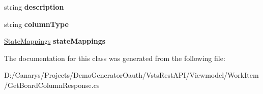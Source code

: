 \begin{DoxyCompactItemize}
\item 
\mbox{\label{class_vsts_rest_a_p_i_1_1_viewmodel_1_1_work_item_1_1_get_board_column_response_1_1_value_a8d75062eb2d2dd4a5b7fe8fcb79acae1}} 
string {\bfseries description}
\item 
\mbox{\label{class_vsts_rest_a_p_i_1_1_viewmodel_1_1_work_item_1_1_get_board_column_response_1_1_value_a50181a91ed336cd9a1e118842fd2546d}} 
string {\bfseries column\+Type}
\item 
\mbox{\label{class_vsts_rest_a_p_i_1_1_viewmodel_1_1_work_item_1_1_get_board_column_response_1_1_value_a2381bc2a31031d7121a291a00adde602}} 
\mbox{\hyperlink{class_vsts_rest_a_p_i_1_1_viewmodel_1_1_work_item_1_1_get_board_column_response_1_1_state_mappings}{State\+Mappings}} {\bfseries state\+Mappings}
\end{DoxyCompactItemize}


The documentation for this class was generated from the following file\+:\begin{DoxyCompactItemize}
\item 
D\+:/\+Canarys/\+Projects/\+Demo\+Generator\+Oauth/\+Vsts\+Rest\+A\+P\+I/\+Viewmodel/\+Work\+Item/Get\+Board\+Column\+Response.\+cs\end{DoxyCompactItemize}
